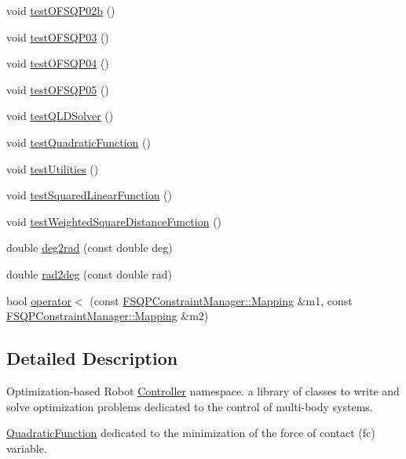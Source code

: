 \begin{DoxyCompactItemize}
\item 
void \hyperlink{namespaceocra_a0f2585280436d8951c1eccbf804525ca}{test\+O\+F\+S\+Q\+P02b} ()
\item 
void \hyperlink{namespaceocra_a45bb08ad25674ac024effc1b52494538}{test\+O\+F\+S\+Q\+P03} ()
\item 
void \hyperlink{namespaceocra_acf7cfddec1df04bdc3e79218c23aa76b}{test\+O\+F\+S\+Q\+P04} ()
\item 
void \hyperlink{namespaceocra_a6f6693e777254b71f5a87a33173d7e90}{test\+O\+F\+S\+Q\+P05} ()
\item 
void \hyperlink{namespaceocra_a2510cb421dc6b566033e810223abdf05}{test\+Q\+L\+D\+Solver} ()
\item 
void \hyperlink{namespaceocra_a9b89d0c6904586983c85a015960bbc6d}{test\+Quadratic\+Function} ()
\item 
void \hyperlink{namespaceocra_a3dca8b5c0944fb95ccafa4b41d169d70}{test\+Utilities} ()
\item 
void \hyperlink{namespaceocra_a6af256e0684d15c6a7f8d485b3c78883}{test\+Squared\+Linear\+Function} ()
\item 
void \hyperlink{namespaceocra_a6bfd3e6e97c1117101ce2cc1c4f91536}{test\+Weighted\+Square\+Distance\+Function} ()
\item 
double \hyperlink{namespaceocra_aa770b1747e9ddd05361e291ad6e598e5}{deg2rad} (const double deg)
\item 
double \hyperlink{namespaceocra_a967dc05d7d0b50212fb79c109a16ace3}{rad2deg} (const double rad)
\item 
bool \hyperlink{namespaceocra_a604361203754e7d30fc3720d29f1c414}{operator$<$} (const \hyperlink{structocra_1_1FSQPConstraintManager_1_1Mapping}{F\+S\+Q\+P\+Constraint\+Manager\+::\+Mapping} \&m1, const \hyperlink{structocra_1_1FSQPConstraintManager_1_1Mapping}{F\+S\+Q\+P\+Constraint\+Manager\+::\+Mapping} \&m2)
\end{DoxyCompactItemize}


\subsection{Detailed Description}
Optimization-\/based Robot \hyperlink{classocra_1_1Controller}{Controller} namespace. a library of classes to write and solve optimization problems dedicated to the control of multi-\/body systems. 

\hyperlink{classocra_1_1QuadraticFunction}{Quadratic\+Function} dedicated to the minimization of the force of contact (fc) variable.

